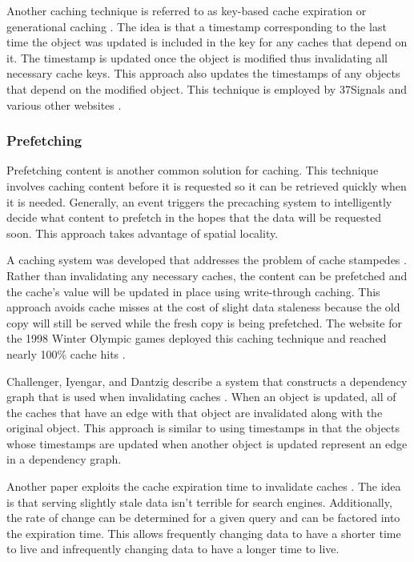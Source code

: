 \documentclass[12pt]{ucthesis}
\begin{document}
Another caching technique is referred to as key-based cache expiration \cite{keyBasedCacheExpiration} or generational caching \cite{generationalCaching}.
The idea is that a timestamp corresponding to the last time the object was updated is included in the key for any caches that depend on it.
The timestamp is updated once the object is modified thus invalidating all necessary cache keys.
This approach also updates the timestamps of any objects that depend on the modified object.
This technique is employed by 37Signals and various other websites \cite{keyBasedCacheExpiration}.

\subsubsection{Prefetching}
Prefetching content is another common solution for caching.
This technique involves caching content before it is requested so it can be retrieved quickly when it is needed.
Generally, an event triggers the precaching system to intelligently decide what content to prefetch in the hopes that the data will be requested soon.
This approach takes advantage of spatial locality.

A caching system was developed that addresses the problem of cache stampedes \cite{scalableConsistentCaching}.
Rather than invalidating any necessary caches, the content can be prefetched and the cache's value will be updated in place using write-through caching.
This approach avoids cache misses at the cost of slight data staleness because the old copy will still be served while the fresh copy is being prefetched.
The website for the 1998 Winter Olympic games deployed this caching technique and reached nearly 100\% cache hits \cite{scalableConsistentCaching}.

Challenger, Iyengar, and Dantzig describe a system that constructs a dependency graph that is used when invalidating caches \cite{scalableConsistentCaching}.
When an object is updated, all of the caches that have an edge with that object are invalidated along with the original object.
This approach is similar to using timestamps in that the objects whose timestamps are updated when another object is updated represent an edge in a dependency graph.

Another paper exploits the cache expiration time to invalidate caches \cite{refreshingPerspectiveSearch}.
The idea is that serving slightly stale data isn't terrible for search engines.
Additionally, the rate of change can be determined for a given query and can be factored into the expiration time.
This allows frequently changing data to have a shorter time to live and infrequently changing data to have a longer time to live.
\end{document}
